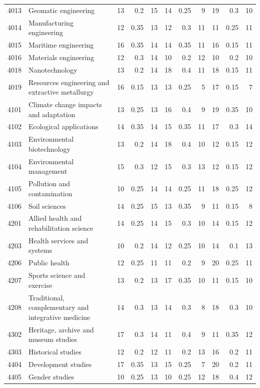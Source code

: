 \begin{longtable}{r p{2.15cm} rrr rrr rrr}
4013 & Geomatic engineering & 13 & 0.2 & 15 & 14 & 0.25 & 9 & 19 & 0.3 & 10 \\
4014 & Manufacturing engineering & 12 & 0.35 & 13 & 12 & 0.3 & 11 & 11 & 0.25 & 11 \\
4015 & Maritime engineering & 16 & 0.35 & 14 & 14 & 0.35 & 11 & 16 & 0.15 & 11 \\
4016 & Materials engineering & 12 & 0.3 & 14 & 10 & 0.2 & 12 & 10 & 0.2 & 10 \\
4018 & Nanotechnology & 13 & 0.2 & 14 & 18 & 0.4 & 11 & 18 & 0.15 & 11 \\
4019 & Resources engineering and extractive metallurgy & 16 & 0.15 & 13 & 13 & 0.25 & 5 & 17 & 0.15 & 7 \\
4101 & Climate change impacts and adaptation & 13 & 0.25 & 13 & 16 & 0.4 & 9 & 19 & 0.35 & 10 \\
4102 & Ecological applications & 14 & 0.35 & 14 & 15 & 0.35 & 11 & 17 & 0.3 & 14 \\
4103 & Environmental biotechnology & 13 & 0.2 & 14 & 18 & 0.4 & 10 & 12 & 0.15 & 12 \\
4104 & Environmental management & 15 & 0.3 & 12 & 15 & 0.3 & 13 & 12 & 0.15 & 12 \\
4105 & Pollution and contamination & 10 & 0.25 & 14 & 14 & 0.25 & 11 & 18 & 0.25 & 12 \\
4106 & Soil sciences & 14 & 0.25 & 15 & 13 & 0.35 & 9 & 11 & 0.15 & 8 \\
4201 & Allied health and rehabilitation science & 14 & 0.25 & 14 & 15 & 0.3 & 10 & 14 & 0.15 & 12 \\
4203 & Health services and systems & 10 & 0.2 & 14 & 12 & 0.25 & 10 & 14 & 0.1 & 13 \\
4206 & Public health & 12 & 0.25 & 11 & 11 & 0.2 & 9 & 20 & 0.25 & 11 \\
4207 & Sports science and exercise & 13 & 0.2 & 13 & 17 & 0.35 & 10 & 11 & 0.15 & 10 \\
4208 & Traditional, complementary and integrative medicine & 14 & 0.3 & 13 & 14 & 0.3 & 8 & 18 & 0.3 & 10 \\
4302 & Heritage, archive and museum studies & 17 & 0.3 & 14 & 11 & 0.4 & 9 & 11 & 0.35 & 12 \\
4303 & Historical studies & 12 & 0.2 & 12 & 11 & 0.2 & 13 & 16 & 0.2 & 11 \\
4404 & Development studies & 17 & 0.35 & 13 & 15 & 0.25 & 7 & 20 & 0.2 & 11 \\
4405 & Gender studies & 10 & 0.25 & 13 & 10 & 0.25 & 12 & 18 & 0.4 & 12 \\

\end{longtable}
